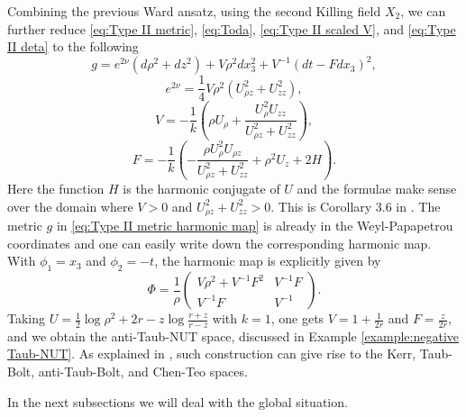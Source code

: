 \documentclass[a4paper,11pt]{amsart}
\theoremstyle{definition}
\numberwithin{equation}{section}
\begin{document}
Combining the previous Ward ansatz, using the second Killing field $X_2$, we can further reduce \eqref{eq:Type II metric}, \eqref{eq:Toda}, \eqref{eq:Type II scaled V}, and \eqref{eq:Type II deta}  to the following
\begin{equation}\label{eq:Type II metric harmonic map}
    g=e^{2\nu}(d\rho^2+dz^2)+V\rho^2dx_3^2+V^{-1}(dt-Fdx_3)^2,
\end{equation}
\begin{equation}\label{eq:Type II nu harmonic}
    e^{2\nu}=\frac14V\rho^2(U_{\rho z}^2+U_{zz}^2),
\end{equation}
\begin{equation}\label{eq:Type II V harmonic}
    V=-\frac{1}{k}\left(\rho U_\rho+\frac{U_\rho^2U_{zz}}{U_{\rho z}^2+U_{zz}^2}\right),
\end{equation}
\begin{equation}\label{eq:Type II F harmonic}
    F=-\frac{1}{k}\left(-\frac{\rho U_\rho^2 U_{\rho z}}{U_{\rho z}^2+U_{zz}^2}+\rho^2U_z+2H\right).
\end{equation}
Here the function $H$ is the harmonic conjugate of $U$ and the formulae make sense over the domain where $V>0$ and $U_{\rho z}^2+U_{zz}^2>0$. This is Corollary 3.6 in \cite{BG}.  The metric $g$ in \eqref{eq:Type II metric harmonic map} is already in the Weyl-Papapetrou coordinates and one can easily write down the corresponding harmonic map. With $\phi_1=x_3$ and $\phi_2=-t$, the harmonic map is explicitly given by
\begin{equation}\label{eq:Type II harmonic map}
    \Phi=\frac{1}{\rho}\left(\begin{matrix}
        V\rho^2+V^{-1}F^2 & V^{-1}F\\ V^{-1}F & V^{-1}
    \end{matrix}\right).
\end{equation}
Taking $U=\frac12\log\rho^2+2r-z\log\frac{r+z}{r-z}$ with $k=1$, one gets $V=1+\frac{1}{2r}$ and $F=\frac{z}{2r}$, and we obtain the anti-Taub-NUT space, discussed in Example \ref{example:negative Taub-NUT}. As explained in \cite{BG}, such construction can give rise to the Kerr, Taub-Bolt, anti-Taub-Bolt, and Chen-Teo spaces.









In the next subsections  we will deal with the global situation. 
\end{document}
